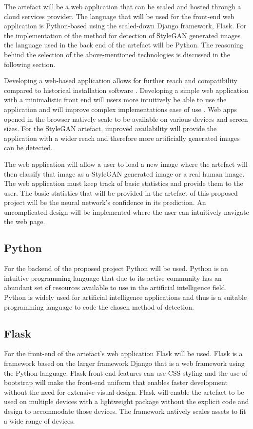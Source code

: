 The artefact will be a web application that can be scaled and hosted through a cloud services provider. The language that will be used for the front-end web application is Python-based using the scaled-down Django framework, Flask. For the implementation of the method for detection of StyleGAN generated images the language used in the back end of the artefact will be Python. The reasoning behind the selection of the above-mentioned technologies is discussed in the following section.

Developing a web-based application allows for further reach and compatibility compared to historical installation software \citep{murugesan2011}. Developing a simple web application with a minimalistic front end will users more intuitively be able to use the application and will improve complex implementations ease of use \citep{murugesan2011}. Web apps opened in the browser natively scale to be available on various devices and screen sizes. For the StyleGAN artefact, improved availability will provide the application with a wider reach and therefore more artificially generated images can be detected. 

The web application will allow a user to load a new image where the artefact will then classify that image as a StyleGAN generated image or a real human image. The web application must keep track of basic statistics and provide them to the user. The basic statistics that will be provided in the artefact of this proposed project will be the neural network's confidence in its prediction. An uncomplicated design will be implemented where the user can intuitively navigate the web page.

\subsection{Python}

For the backend of the proposed project Python will be used. Python is an intuitive programming language that due to its active community has an abundant set of resources available to use in the artificial intelligence field. Python is widely used for artificial intelligence applications and thus is a suitable programming language to code the chosen method of detection.

\subsection{Flask}

For the front-end of the artefact’s web application Flask will be used. Flask is a framework based on the larger framework Django that is a web framework using the Python language. Flask front-end features can use CSS-styling and the use of bootstrap will make the front-end uniform that enables faster development without the need for extensive visual design. Flask will enable the artefact to be used on multiple devices with a lightweight package without the explicit code and design to accommodate those devices. The framework natively scales assets to fit a wide range of devices.

